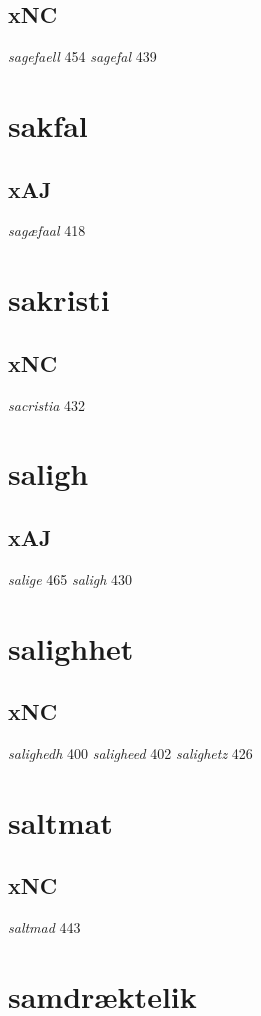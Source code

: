 \documentclass[a4paper,twocolumn]{article}
\begin{document}
\subsection{xNC}
\label{sec:org873be1e}
\emph{sagefaell} 454 \emph{sagefal} 439 
\section{sakfal}
\label{sec:org82c42ca}
\subsection{xAJ}
\label{sec:org72c1606}
\emph{sagæfaal} 418 
\section{sakristi}
\label{sec:org0c5c033}
\subsection{xNC}
\label{sec:orge74f1d6}
\emph{sacristia} 432 
\section{saligh}
\label{sec:org438044c}
\subsection{xAJ}
\label{sec:org039e2e7}
\emph{salige} 465 \emph{saligh} 430 
\section{salighhet}
\label{sec:org8692053}
\subsection{xNC}
\label{sec:org2b53a72}
\emph{salighedh} 400 \emph{saligheed} 402 \emph{salighetz} 426 
\section{saltmat}
\label{sec:org1c7d7d8}
\subsection{xNC}
\label{sec:org2f9fdb9}
\emph{saltmad} 443 
\section{samdræktelik}
\label{sec:orgbc87d4b}
\end{document}

